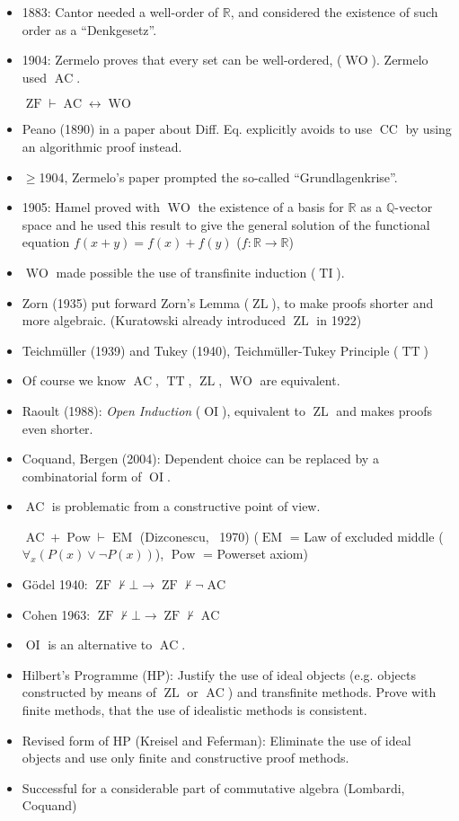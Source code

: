 \documentclass[headsepline=true,DIV=11]{scrartcl}
\theoremstyle{definition}
\newcommand{\WO}{\operatorname{WO}}
\newcommand{\AC}{\operatorname{AC}}
\newcommand{\ZF}{\operatorname{ZF}}
\newcommand{\TI}{\operatorname{TI}}
\newcommand{\TT}{\operatorname{TT}}
\newcommand{\ZL}{\operatorname{ZL}}
\newcommand{\CC}{\operatorname{CC}}
\newcommand{\OI}{\operatorname{OI}}
\newcommand{\Pow}{\operatorname{Pow}}
\newcommand{\EM}{\operatorname{EM}}
\begin{document}
\begin{itemize}
	\item 1883: Cantor needed a well-order of $\mathbb R$, and considered the existence of such order as a ``Denkgesetz''.
	\item 1904: Zermelo proves that every set can be well-ordered, ($\WO$). Zermelo used $\AC$.

		$\ZF\vdash\AC\leftrightarrow\WO$
	\item Peano (1890) in a paper about Diff. Eq. explicitly avoids to use $\CC$ by using an algorithmic proof instead.
	\item $\ge$1904, Zermelo's paper prompted the so-called ``Grundlagenkrise''.
	\item 1905: Hamel proved with $\WO$ the existence of a basis for $\mathbb R$ as a $\mathbb Q$-vector space and he used this result to give the general solution of the functional equation $f(x+y)=f(x)+f(y)$ ($f\colon \mathbb R\to \mathbb R$)
	\item $\WO$ made possible the use of transfinite induction ($\TI$).
	\item Zorn (1935) put forward Zorn's Lemma ($\ZL$), to make proofs shorter and more algebraic. (Kuratowski already introduced $\ZL$ in 1922)
	\item Teichmüller (1939) and Tukey (1940), Teichmüller-Tukey Principle ($\TT$)
	\item Of course we know $\AC$, $\TT$, $\ZL$, $\WO$ are equivalent.
	\item Raoult (1988): {\em Open Induction} ($\OI$), equivalent to $\ZL$ and makes proofs even shorter.
	\item Coquand, Bergen (2004): Dependent choice can be replaced by a combinatorial form of $\OI$.
	\item $\AC$ is problematic from a constructive point of view. 

	$\AC + \Pow\vdash \EM$ (Dizconescu, ~1970) ($\EM$ = Law of excluded middle ($\forall_x (P(x)\lor\neg P(x))$), $\Pow$ = Powerset axiom)
	\item Gödel 1940: $\ZF \not\vdash \bot \to \ZF\not\vdash \neg \AC$
	\item Cohen 1963: $\ZF \not\vdash \bot \to \ZF\not\vdash \AC$
	\item $\OI$ is an alternative to $\AC$.
	\item Hilbert's Programme (HP): Justify the use of ideal objects (e.g. objects constructed by means of $\ZL$ or $\AC$) and transfinite methods.
		Prove with finite methods, that the use of idealistic methods is consistent.
	\item Revised form of HP (Kreisel and Feferman): Eliminate the use of ideal objects and use only finite and constructive proof methods.
	\item Successful for a considerable part of commutative algebra (Lombardi, Coquand)
\end{itemize}
\end{document}
